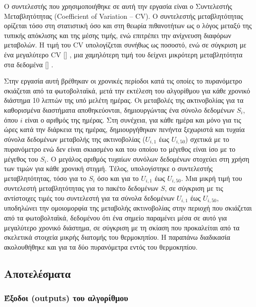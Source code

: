 \documentclass[12pt, a4paper]{report} %
\DeclareRobustCommand{\lcitep}[1]{%
  \english{[\cite{#1}]}%
}
\newcommand{\english}{\foreignlanguage{english}}
\begin{document}
Ο συντελεστής που χρησιμοποιήθηκε σε αυτή την εργασία είναι ο Συντελεστής Μεταβλητότητας (\english{Coefficient of Variation – CV}). 
Ο συντελεστής μεταβλητότητας ορίζεται τόσο στη στατιστική όσο και στη θεωρία πιθανοτήτων ως ο λόγος μεταξύ της τυπικής απόκλισης 
και της μέσης τιμής, ενώ επιτρέπει την ανίχνευση διαφόρων μεταβολών. Η τιμή του \english{CV} υπολογίζεται συνήθως ως ποσοστό, ενώ 
σε σύγκριση με ένα μεγαλύτερο \english{CV} \lcitep{algorithm_bib23}, μια χαμηλότερη τιμή του δείχνει μικρότερη μεταβλητότητα στα 
δεδομένα \lcitep{algorithm_bib22,algorithm_bib24}.

Στην εργασία αυτή βρέθηκαν οι χρονικές περίοδοι κατά τις οποίες το πυρανόμετρο σκιάζεται από τα φωτοβολταϊκά, μετά την εκτέλεση 
του αλγορίθμου για κάθε χρονικό διάστημα 10 λεπτών της υπό μελέτη ημέρας. Οι μεταβολές της ακτινοβολίας για τα καθορισμένα 
διαστήματα αποθηκεύονται, δημιουργώντας ένα σύνολο δεδομένων $S_i$, όπου $i$ είναι ο αριθμός της ημέρας. Στη συνέχεια, για 
κάθε ημέρα και μόνο για τις ώρες κατά την διάρκεια της ημέρας, δημιουργήθηκαν πενήντα ξεχωριστά και τυχαία σύνολα δεδομένων 
μεταβολής της ακτινοβολίας ($U_{i,1}$ έως $U_{i,50}$) σχετικά με το πυρανόμετρο ενώ δεν είναι σκιασμένο και του οποίου το μέγεθος 
είναι ίσο με το μέγεθος του $S_i$. Ο μεγάλος αριθμός τυχαίων συνόλων δεδομένων στοχεύει στη χρήση των τιμών για κάθε χρονική 
στιγμή. Τέλος, υπολογίστηκε ο συντελεστής μεταβλητότητας, τόσο για το $S_i$ όσο και για το $U_{i,1}$ έως $U_{i,50}$. Μια μικρή 
τιμή του συντελεστή μεταβλητότητας για το πακέτο δεδομένων $S$, σε σύγκριση με τις αντίστοιχες τιμές του συντελεστή για τα σύνολα 
δεδομένων $U_{i,1}$ έως $U_{i,50}$, υποδηλώνει την ομοιομορφία της μεταβολής ακτινοβολίας στην περιοχή που σκιάζεται από τα 
φωτοβολταϊκά, δεδομένου ότι ένα σημείο παραμένει μέσα σε αυτό για μεγαλύτερο χρονικό διάστημα,  σε σύγκριση με τη σκίαση που 
προκαλείται από τα σκελετικά στοιχεία μικρής διατομής του θερμοκηπίου. Η παραπάνω διαδικασία ακολουθήθηκε και για τα δύο 
πυρανόμετρα εντός του θερμοκηπίου.

\subsection{Αποτελέσματα}\label{sub_alg_results}

\subsubsection{Έξοδοι (\english{outputs}) του αλγορίθμου}\label{subsub_alg_outs}
\end{document}
